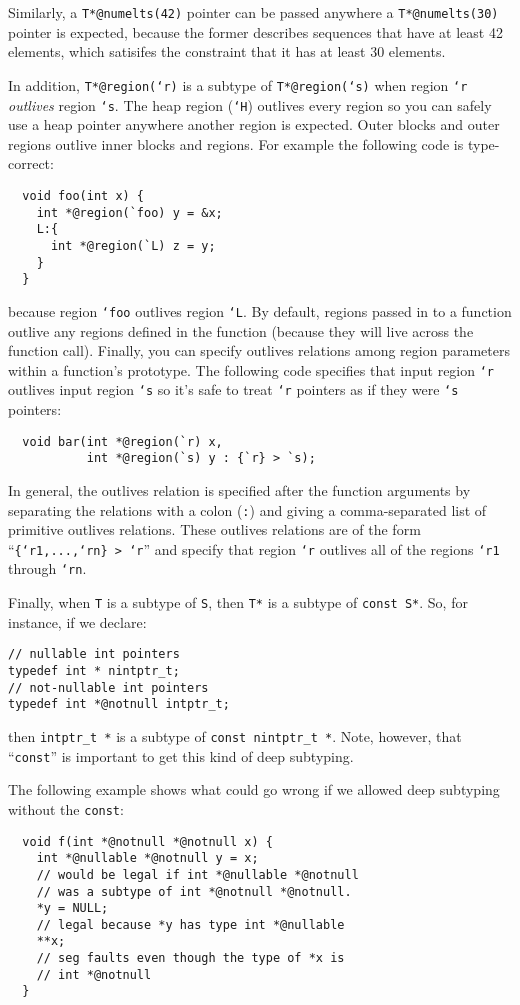 Similarly, a \texttt{T*@numelts(42)} pointer can be passed anywhere a
\texttt{T*@numelts(30)} pointer is expected, because the former
describes sequences that have at least 42 elements, which satisifes
the constraint that it has at least 30 elements.

In addition, \texttt{T*@region(`r)} is a subtype of \texttt{T*@region(`s)}
when region \texttt{`r} \emph{outlives} region \texttt{`s}.  The
heap region (\texttt{`H}) outlives every region so you can safely
use a heap pointer anywhere another region is expected.  Outer
blocks and outer regions outlive inner blocks and regions.  For
example the following code is type-correct:
\begin{verbatim}
  void foo(int x) {
    int *@region(`foo) y = &x;
    L:{
      int *@region(`L) z = y;
    }
  }
\end{verbatim}
because region \texttt{`foo} outlives region \texttt{`L}.  By
default, regions passed in to a function outlive any regions
defined in the function (because they will live across the
function call).  Finally, you can specify outlives relations
among region parameters within a function's prototype.  The
following code specifies that input region \texttt{`r} outlives
input region \texttt{`s} so it's safe to treat \texttt{`r} pointers
as if they were \texttt{`s} pointers:
\begin{verbatim}
  void bar(int *@region(`r) x,
           int *@region(`s) y : {`r} > `s);
\end{verbatim}
In general, the outlives relation is specified after the function
arguments by separating the relations with a colon (\texttt{:}) and
giving a comma-separated list of primitive outlives relations.
These outlives relations are of the form ``\texttt{\{`r1,...,`rn\} > `r}''
and specify that region \texttt{`r} outlives all of the regions
\texttt{`r1} through \texttt{`rn}.

Finally, when \texttt{T} is a subtype of \texttt{S}, then
\texttt{T*} is a subtype of \texttt{const S*}.  So, for
instance, if we declare:
\begin{verbatim}
// nullable int pointers
typedef int * nintptr_t;
// not-nullable int pointers
typedef int *@notnull intptr_t;
\end{verbatim}
then \texttt{intptr_t *} is a subtype of \texttt{const nintptr_t *}.
Note, however, that ``\texttt{const}'' is important to get this
kind of deep subtyping.  

The following example shows what could go wrong if we allowed
deep subtyping without the \texttt{const}:
\begin{verbatim}
  void f(int *@notnull *@notnull x) {
    int *@nullable *@notnull y = x; 
    // would be legal if int *@nullable *@notnull 
    // was a subtype of int *@notnull *@notnull.
    *y = NULL;    
    // legal because *y has type int *@nullable
    **x;          
    // seg faults even though the type of *x is 
    // int *@notnull
  }
\end{verbatim}

